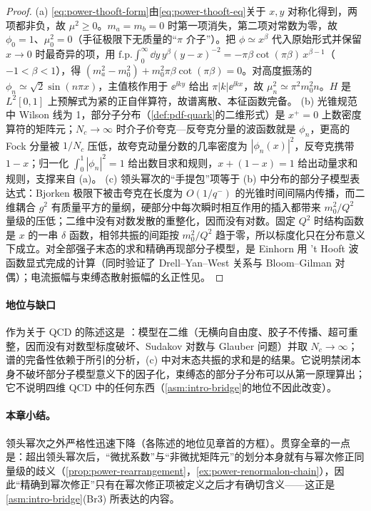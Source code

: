 \begin{proof}
(a) \eqref{eq:power-thooft-form}由\eqref{eq:power-thooft-eq}关于 $x,y$ 对称化得到，两项都非负，故 $\mu^2\ge0$。$m_a=m_b=0$ 时第一项消失，第二项对常数为零，故 $\phi_0=1$、$\mu_0^2=0$（手征极限下无质量的“$\pi$ 介子”）。把 $\phi\simeq x^\beta$ 代入原始形式并保留 $x\to0$ 时最奇异的项，用 $\mathrm{f.p.}\int_0^\infty\dd y\,y^\beta(y-x)^{-2}=-\pi\beta\cot(\pi\beta)\,x^{\beta-1}$（$-1<\beta<1$），得 $(m_a^2-m_0^2)+m_0^2\pi\beta\cot(\pi\beta)=0$。对高度振荡的 $\phi_n\simeq\sqrt2\sin(n\pi x)$，主值核作用于 $\ee^{\ii ky}$ 给出 $\pi|k|\ee^{\ii kx}$，故 $\mu_n^2\simeq\pi^2m_0^2n$。$H$ 是 $L^2[0,1]$ 上预解式为紧的正自伴算符，故谱离散、本征函数完备\cite{tHooft1974,Einhorn1976}。
(b) 光锥规范中 Wilson 线为 1，部分子分布（\cref{def:pdf-quark}的二维形式）是 $x^+=0$ 上数密度算符的矩阵元；$N_c\to\infty$ 时介子价夸克—反夸克分量的波函数就是 $\phi_n$，更高的 Fock 分量被 $1/N_c$ 压低\cite{Einhorn1976}，故夸克动量分数的几率密度为 $|\phi_n(x)|^2$，反夸克携带 $1-x$；归一化 $\int_0^1|\phi_n|^2=1$ 给出数目求和规则，$x+(1-x)=1$ 给出动量求和规则，支撑来自 (a)。
(c) 领头幂次的“手提包”项等于 (b) 中分布的部分子模型表达式：Bjorken 极限下被击夸克在长度为 $O(1/q^-)$ 的光锥时间间隔内传播，而二维耦合 $g^2$ 有质量平方的量纲，硬部分中每次瞬时相互作用的插入都带来 $m_0^2/Q^2$ 量级的压低；二维中没有对数发散的重整化，因而没有对数。固定 $Q^2$ 时结构函数是 $x$ 的一串 $\delta$ 函数，相邻共振的间距按 $m_0^2/Q^2$ 趋于零，所以标度化只在分布意义下成立。对全部强子末态的求和精确再现部分子模型，是 Einhorn 用 't Hooft 波函数显式完成的计算（同时验证了 Drell--Yan--West 关系与 Bloom--Gilman 对偶）\cite{Einhorn1976}；电流振幅与束缚态散射振幅的幺正性见\cite{CallanCooteGross1976}。
\end{proof}

\paragraph{地位与缺口}
作为关于 QCD 的陈述这是 \tagP：模型在二维（无横向自由度、胶子不传播、超可重整，因而没有对数型标度破坏、Sudakov 对数与 Glauber 问题）并取 $N_c\to\infty$；谱的完备性依赖于所引的分析，(c) 中对末态共振的求和是\cite{Einhorn1976}的结果。它说明禁闭本身不破坏部分子模型意义下的因子化，束缚态的部分子分布可以从第一原理算出；它不说明四维 QCD 中的任何东西（\cref{asm:intro-bridge}的地位不因此改变）。

\paragraph{本章小结。}
领头幂次之外严格性迅速下降（各陈述的地位见章首的方框）。贯穿全章的一点是：超出领头幂次后，“微扰系数”与“非微扰矩阵元”的划分本身就有与幂次修正同量级的歧义（\cref{prop:power-rearrangement}，\cref{ex:power-renormalon-chain}），因此“精确到幂次修正”只有在幂次修正项被定义之后才有确切含义——这正是\cref{asm:intro-bridge}(Br3) 所表达的内容。
